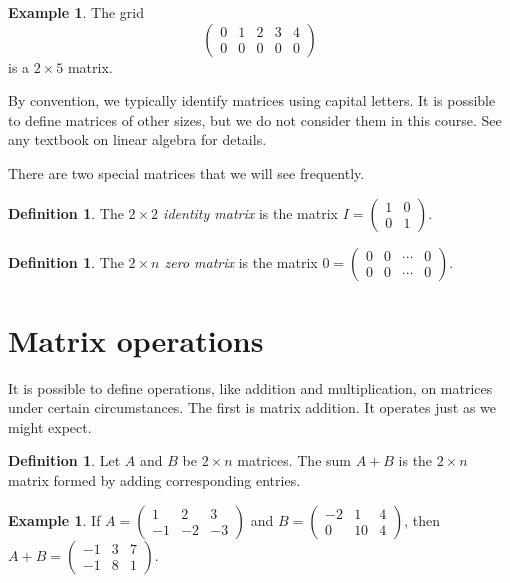 \documentclass{book}
\theoremstyle{plain}
\theoremstyle{definition}
\newtheorem{definition}[theorem]{Definition}
\newtheorem{example}[theorem]{Example}
\begin{document}
\begin{example}
The grid $$\begin{pmatrix} 0 & 1 & 2 & 3 & 4 \\ 0 & 0 & 0 & 0 & 0 \end{pmatrix}$$ is a $2 \times 5$ matrix.
\end{example}

By convention, we typically identify matrices using capital letters. It is possible to define matrices of other sizes, but we do not consider them in this course. See any textbook on linear algebra for details.

There are two special matrices that we will see frequently.

\begin{definition}
The {\it $2 \times 2$ identity matrix} is the matrix $I = \begin{pmatrix} 1 & 0 \\ 0 & 1 \end{pmatrix}$.
\end{definition}

\begin{definition}
The {\it $2 \times n$ zero matrix} is the matrix $0 = \begin{pmatrix} 0 & 0 & \cdots & 0 \\ 0 & 0 & \cdots & 0 \end{pmatrix}$.
\end{definition}

\section{Matrix operations}
It is possible to define operations, like addition and multiplication, on matrices under certain circumstances. The first is matrix addition. It operates just as we might expect.

\begin{definition}
Let $A$ and $B$ be $2 \times n$ matrices. The sum $A + B$ is the $2 \times n$ matrix formed by adding corresponding entries.
\end{definition}

\begin{example}
If $A = \begin{pmatrix} 1 & 2 & 3 \\ -1 & -2 & -3 \end{pmatrix}$ and $B = \begin{pmatrix} -2 & 1 & 4 \\ 0 & 10 & 4 \end{pmatrix}$, then $A + B = \begin{pmatrix} -1 & 3 & 7 \\ -1 & 8 & 1 \end{pmatrix}$.
\end{example}
\end{document}
